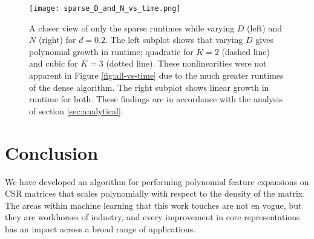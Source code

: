 \documentclass[journal]{journal}
\begin{document}
\begin{figure*}[ht!]
\vskip 0.2in
\begin{center}
\centerline{\texttt{[image: sparse\_D\_and\_N\_vs\_time.png]}}
\caption{A closer view of only the sparse runtimes while varying $D$ (left) and $N$ (right) for $d = 0.2$. The left subplot shows that varying $D$ gives polynomial growth in runtime; quadratic for $K = 2$ (dashed line) and cubic for $K = 3$ (dotted line). These nonlinearities were not apparent in Figure \ref{fig:all-vs-time} due to the much greater runtimes of the dense algorithm. The right subplot shows linear growth in runtime for both. These findings are in accordance with the analysis of section \ref{sec:analytical}.}
\label{fig:sparse_D_and_N_vs_time}
\end{center}
\vskip -0.2in
\end{figure*}


\section{Conclusion}
We have developed an algorithm for performing polynomial feature expansions on CSR matrices that scales polynomially with respect to the density of the matrix.
The areas within machine learning that this work touches are not en vogue, but they are workhorses of industry, and every improvement in core representations has an impact across a broad range of applications. 

% 
% 
% 
% 
\end{document}
